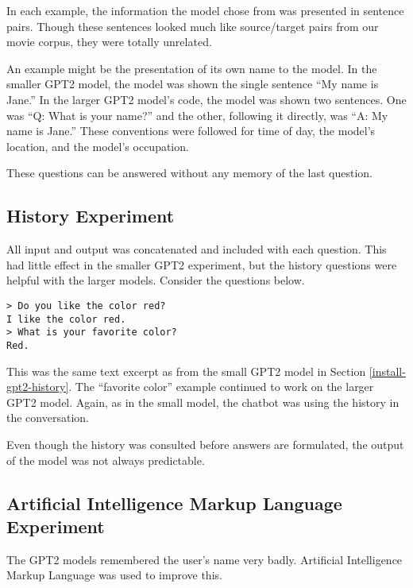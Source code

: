 In each example, the information the model chose from was presented in sentence pairs. Though these sentences looked much like source/target pairs from our movie corpus, they were totally unrelated.

An example might be the presentation of its own name to the model. In the smaller GPT2 model, the model was shown the single sentence ``My name is Jane.'' In the larger GPT2 model's code, the model was shown two sentences. One was ``Q: What is your name?'' and the other, following it directly, was ``A: My name is Jane.'' These conventions were followed for time of day, the model's location, and the model's occupation.

These questions can be answered without any memory of the last question.

\subsection{History Experiment}

All input and output was concatenated and included with each question. This had little effect in the smaller GPT2 experiment, but the history questions were helpful with the larger models. Consider the questions below.
\begin{verbatim}
> Do you like the color red?
I like the color red.
> What is your favorite color?
Red.
\end{verbatim}
This was the same text excerpt as from the small GPT2 model in Section \ref{install-gpt2-history}. The ``favorite color'' example continued to work on the larger GPT2 model. Again, as in the small model, the chatbot was using the history in the conversation. 

Even though the history was consulted before answers are formulated, the output of the model was not always predictable. %


\subsection{Artificial Intelligence Markup Language Experiment}

The GPT2 models remembered the user's name very badly. %
Artificial Intelligence Markup Language was used to improve this. 

